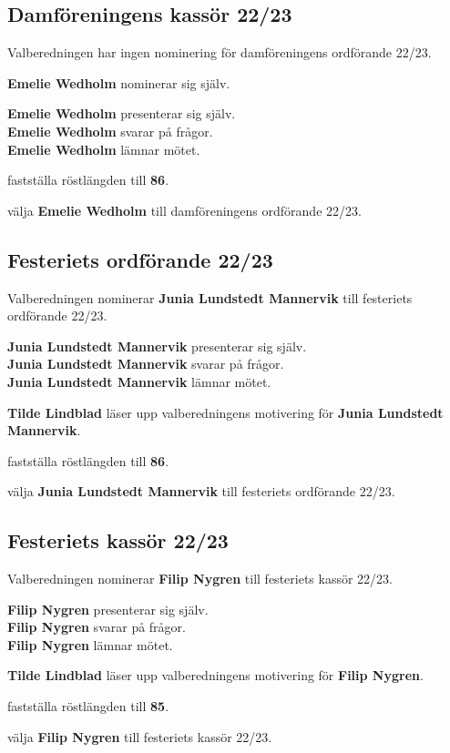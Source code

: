 \documentclass[../protokoll_vintermote_2022.tex]{subfiles}
\begin{document}
\subsection{Damföreningens kassör 22/23}
Valberedningen har ingen nominering för damföreningens ordförande 22/23.

\textbf{Emelie Wedholm} nominerar sig själv.

\textbf{Emelie Wedholm} presenterar sig själv.\\
\textbf{Emelie Wedholm} svarar på frågor.\\
\textbf{Emelie Wedholm} lämnar mötet.


\motetbeslutar\att{} fastställa röstlängden till \textbf{86}.

\motetbeslutar
\att{} välja \textbf{Emelie Wedholm} till damföreningens ordförande 22/23.





\subsection{Festeriets ordförande 22/23}
Valberedningen nominerar \textbf{Junia Lundstedt Mannervik} till festeriets ordförande 22/23.

\textbf{Junia Lundstedt Mannervik} presenterar sig själv.\\
\textbf{Junia Lundstedt Mannervik} svarar på frågor.\\
\textbf{Junia Lundstedt Mannervik} lämnar mötet.

\textbf{Tilde Lindblad} läser upp valberedningens motivering för \textbf{Junia Lundstedt Mannervik}.

\motetbeslutar\att{} fastställa röstlängden till \textbf{86}.

\motetbeslutar
\att{} välja \textbf{Junia Lundstedt Mannervik} till festeriets ordförande 22/23.








\subsection{Festeriets kassör 22/23}
Valberedningen nominerar \textbf{Filip Nygren} till festeriets kassör 22/23.

\textbf{Filip Nygren} presenterar sig själv.\\
\textbf{Filip Nygren} svarar på frågor.\\
\textbf{Filip Nygren} lämnar mötet.

\textbf{Tilde Lindblad} läser upp valberedningens motivering för \textbf{Filip Nygren}.

\motetbeslutar\att{} fastställa röstlängden till \textbf{85}.

\motetbeslutar
\att{} välja \textbf{Filip Nygren} till festeriets kassör 22/23.
\end{document}
